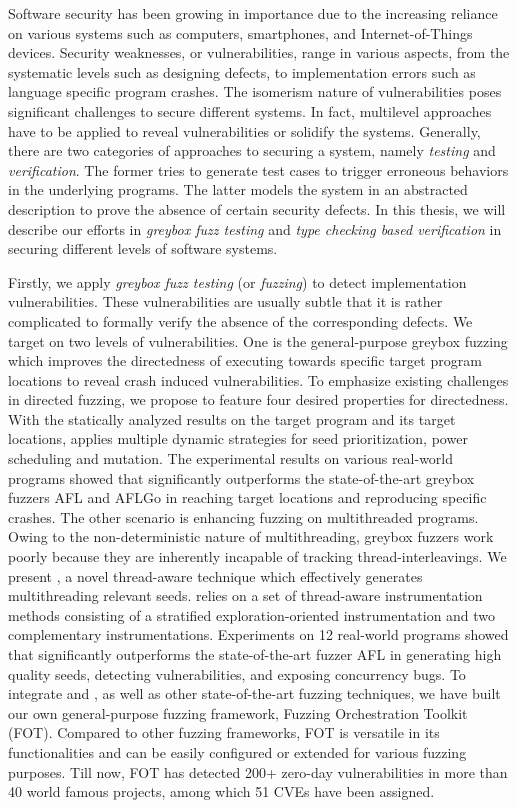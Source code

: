 Software security has been growing in importance due to the increasing reliance on various systems such as computers, smartphones, and Internet-of-Things devices. Security weaknesses, or vulnerabilities, range in various aspects, from the systematic levels such as designing defects, to implementation errors such as language specific program crashes. The isomerism nature of vulnerabilities poses significant challenges to secure different systems. In fact, multilevel approaches have to be applied to reveal vulnerabilities or solidify the systems. Generally, there are two categories of approaches to securing a system, namely \emph{testing} and \emph{verification}. The former tries to generate test cases to trigger erroneous behaviors in the underlying programs. The latter models the system in an abstracted description to prove the absence of certain security defects.
  In this thesis, we will describe our efforts in \emph{greybox fuzz testing} and \emph{type checking based verification} in securing different levels of software systems.

Firstly, we apply \emph{greybox fuzz testing} (or \emph{fuzzing}) to detect implementation vulnerabilities. These vulnerabilities are usually subtle that it is rather complicated to formally verify the absence of the corresponding defects. We target on two levels of vulnerabilities.
One is the general-purpose greybox fuzzing which improves the directedness of executing towards specific target program locations to reveal crash induced vulnerabilities. To emphasize existing challenges in \mbox{directed} fuzzing, we propose \dFOT to feature four desired properties for directedness. With the statically analyzed results on the target program and its target locations, \dFOT applies multiple dynamic strategies for seed prioritization, power scheduling and \mbox{mutation}. The experimental results on various real-world \mbox{programs} showed that \dFOT significantly outperforms the state-of-the-art greybox fuzzers AFL and AFLGo in reaching target locations and reproducing specific crashes.
The other scenario is enhancing fuzzing on multithreaded programs. Owing to the non-deterministic nature of multithreading, greybox fuzzers work poorly because they are inherently incapable of tracking thread-interleavings. We present \mtfuzz, a novel thread-aware technique which effectively generates multithreading relevant seeds. \mtfuzz relies on a set of thread-aware instrumentation methods consisting of a stratified exploration-oriented instrumentation and two complementary instrumentations. Experiments on 12 real-world programs showed that \mtfuzz significantly outperforms the state-of-the-art fuzzer AFL in generating high quality seeds, detecting vulnerabilities, and exposing concurrency bugs.
To integrate \dFOT and \mtfuzz, as well as other state-of-the-art fuzzing techniques, we have built our own general-purpose fuzzing framework, Fuzzing Orchestration Toolkit (FOT). Compared to other fuzzing frameworks, FOT is versatile in its functionalities and can be easily configured or extended for various fuzzing purposes. Till now, FOT has detected 200+ zero-day vulnerabilities in more than 40 world famous projects, among which 51 CVEs have been assigned.

